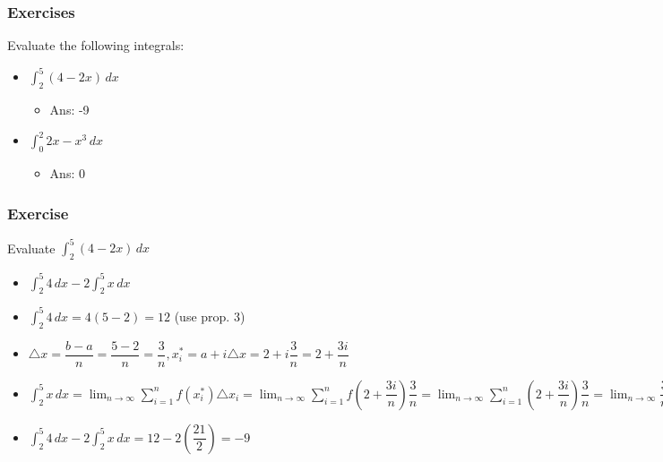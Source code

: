 \documentclass[t]{beamer}
\theoremstyle{plain}
\theoremstyle{definition}
\newcommand{\ds}{\displaystyle}
\begin{document}
\begin{frame}
\frametitle{Exercises}

Evaluate the following integrals:

\begin{itemize}
	\item $\ds\int_2^5 (4 - 2x) \, dx$
	\begin{itemize}
		\item Ans: -9
	\end{itemize}
	\item $\ds\int_0^2 2x - x^3 \, dx$
	\begin{itemize}
		\item Ans: 0
	\end{itemize}
\end{itemize}

\end{frame}

\begin{frame}
\frametitle{Exercise}
\footnotesize
Evaluate $\ds\int_2^5 (4 - 2x) \, dx$ \pause

\begin{itemize}
	\item $ \ds\int_2^5 4 \, dx  -  2 \ds\int_2^5 x\, dx$
	\item $\ds\int_2^5 4 \, dx = 4(5-2) = 12$ (use prop. 3)
	\item $\triangle x = \dfrac{b-a}{n} = \dfrac{5-2}{n} = \dfrac{3}{n}, x_i^{*} = a + i\triangle{x} = 2 + i\dfrac{3}{n} = 2 + \dfrac{3i}{n}$
	\item $\ds\int_2^5 x \, dx =  \lim_{n\rightarrow \infty} \sum_{i=1}^{n} f(x_{i}^{*})\triangle x_{i} = \lim_{n\rightarrow \infty} \sum_{i=1}^{n} f(2 + \dfrac{3i}{n}) \dfrac{3}{n} = \lim_{n\rightarrow \infty}  \sum_{i=1}^{n}  (2 + \dfrac{3i}{n})\dfrac{3}{n}   =  \lim_{n\rightarrow \infty} \dfrac{3}{n}  \left( \sum_{i=1}^{n}  2 +  \dfrac{3}{n}  \sum_{i=1}^{n} i\right) = \lim_{n\rightarrow \infty} \dfrac{3}{n}  \left(2n +  \dfrac{3}{n}( \dfrac{n(n+1)}{2})\right) =  \lim_{n\rightarrow \infty} \dfrac{6n}{n} + \dfrac{9n + 9}{2n} = 6 + \frac{9}{2} + 0 = \frac{21}{2}$
	\item  $ \ds\int_2^5 4 \, dx  -  2 \ds\int_2^5 x\, dx =  12 - 2(\dfrac{21}{2}) = -9$
\end{itemize}

\end{frame}
\end{document}
